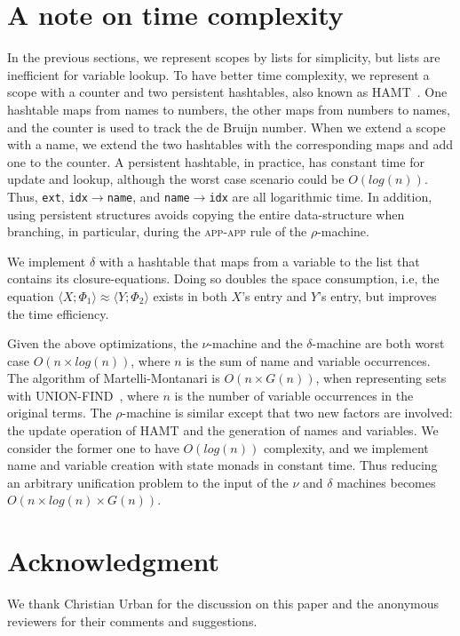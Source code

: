 \documentclass[a4paper,UKenglish]{lipics-v2016}
\newcommand{\clos}[2] {
  \langle #1; #2 \rangle
}
\newcommand{\aeq}[4] {
  \clos{#1}{#2} \approx \clos{#3}{#4}
}
\newcommand*{\transname}[1]{\textsc{#1}}
\begin{document}
\section{A note on time complexity}
    \label{efficiency}

In the previous sections, we represent scopes by lists for simplicity,
but lists are inefficient for variable lookup.  To have better time
complexity, we represent a scope with a counter and two persistent
hashtables, also known as HAMT~\citep{bagwell_ideal_2001}.  One
hashtable maps from names to numbers, the other maps from numbers to
names, and the counter is used to track the de Bruijn number.  When we
extend a scope with a name, we extend the two hashtables with the
corresponding maps and add one to the counter.  A persistent
hashtable, in practice, has constant time for update and lookup,
although the worst case scenario could be $O(log(n))$.  Thus,
\texttt{ext}, \texttt{idx$\rightarrow$name}, and
\texttt{name$\rightarrow$idx} are all logarithmic time.  In addition,
using persistent structures avoids copying the entire data-structure
when branching, in particular, during the \transname{app-app} rule of
the $\rho$-machine.

We implement $\delta$ with a hashtable that maps from a variable to
the list that contains its closure-equations.  Doing so doubles the
space consumption, i.e, the equation $\aeq{X}{\Phi_1}{Y}{\Phi_2}$
exists in both $X$'s entry and $Y$'s entry, but improves the time
efficiency.

Given the above optimizations, the $\nu$-machine and the
$\delta$-machine are both worst case $O(n \times log(n))$,
where $n$ is the sum of name and variable occurrences.
The algorithm of Martelli-Montanari is $O(n \times G(n))$, when
representing sets with UNION-FIND~\citep{tarjan_efficiency_1975}, where
$n$ is the number of variable occurrences in the original terms.  The
$\rho$-machine is similar except that two new factors are involved:
the update operation of HAMT and the generation of names and
variables.  We consider the former one to have $O(log(n))$ complexity,
and we implement name and variable creation with state monads in
constant time.  Thus reducing an arbitrary unification problem to the
input of the $\nu$ and $\delta$ machines becomes $O(n \times log(n) \times
G(n))$.

\section*{Acknowledgment}
We thank Christian Urban for the discussion on this paper
and the anonymous reviewers for their comments and suggestions.

    \clearpage


\end{document}
